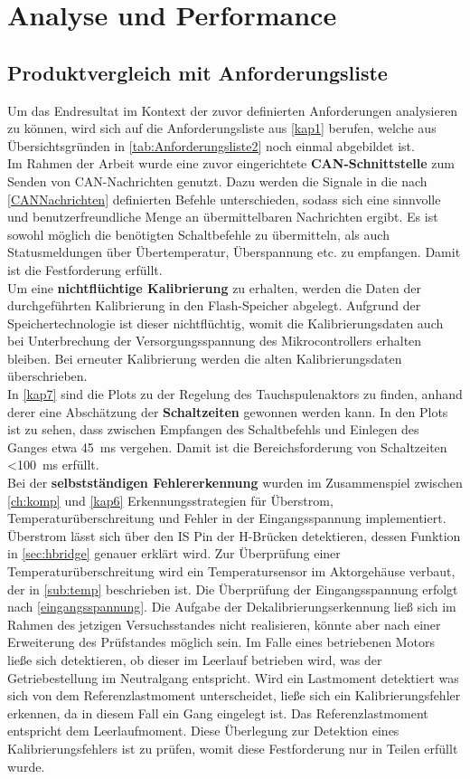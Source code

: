 \chapter{Analyse und Performance}\label{kap7}
\section{Produktvergleich mit Anforderungsliste}\label{vergleich}
Um das Endresultat im Kontext der zuvor definierten Anforderungen analysieren zu können, wird sich auf die Anforderungsliste aus \autoref{kap1} berufen, welche aus Übersichtsgründen in \autoref{tab:Anforderungsliste2} noch einmal abgebildet ist.\\ 
Im Rahmen der Arbeit wurde eine zuvor eingerichtete \textbf{CAN-Schnittstelle} zum Senden von CAN-Nachrichten genutzt. Dazu werden die Signale in die nach \autoref{CANNachrichten} definierten Befehle unterschieden, sodass sich eine sinnvolle und benutzerfreundliche Menge an übermittelbaren Nachrichten ergibt. Es ist sowohl möglich die benötigten Schaltbefehle zu übermitteln, als auch Statusmeldungen über Übertemperatur, Überspannung etc. zu empfangen. Damit ist die Festforderung erfüllt.\\
Um eine \textbf{nichtflüchtige Kalibrierung} zu erhalten, werden die Daten der durchgeführten Kalibrierung in den Flash-Speicher abgelegt. Aufgrund der Speichertechnologie ist dieser nichtflüchtig, womit die Kalibrierungsdaten auch bei Unterbrechung der Versorgungsspannung des Mikrocontrollers erhalten bleiben. Bei erneuter Kalibrierung werden die alten Kalibrierungsdaten überschrieben.\\
In \autoref{kap7} sind die Plots zu der Regelung des Tauchspulenaktors zu finden, anhand derer eine Abschätzung der \textbf{Schaltzeiten} gewonnen werden kann. In den Plots ist zu sehen, dass zwischen Empfangen des Schaltbefehls und Einlegen des Ganges etwa \SI{45}{ms} vergehen. Damit ist die Bereichsforderung von Schaltzeiten \SI{<100}{ms} erfüllt.\\
Bei der \textbf{selbstständigen Fehlererkennung} wurden im Zusammenspiel zwischen \autoref{ch:komp} und \autoref{kap6} Erkennungsstrategien für Überstrom, Temperaturüberschreitung und Fehler in der Eingangsspannung implementiert. Überstrom lässt sich über den IS Pin der H-Brücken detektieren, dessen Funktion in \autoref{sec:hbridge} genauer erklärt wird. Zur Überprüfung einer Temperaturüberschreitung wird ein Temperatursensor im Aktorgehäuse verbaut, der in \autoref{sub:temp} beschrieben ist. Die Überprüfung der Eingangsspannung erfolgt nach \autoref{eingangsspannung}. Die Aufgabe der Dekalibrierungserkennung ließ sich im Rahmen des jetzigen Versuchsstandes nicht realisieren, könnte aber nach einer Erweiterung des Prüfstandes möglich sein. Im Falle eines betriebenen Motors ließe sich detektieren, ob dieser im Leerlauf betrieben wird, was der Getriebestellung im Neutralgang entspricht. Wird ein Lastmoment detektiert was sich von dem Referenzlastmoment unterscheidet, ließe sich ein Kalibrierungsfehler erkennen, da in diesem Fall ein Gang eingelegt ist. Das Referenzlastmoment entspricht dem Leerlaufmoment. Diese Überlegung zur Detektion eines Kalibrierungsfehlers ist zu prüfen, womit diese Festforderung nur in Teilen erfüllt wurde.\\
